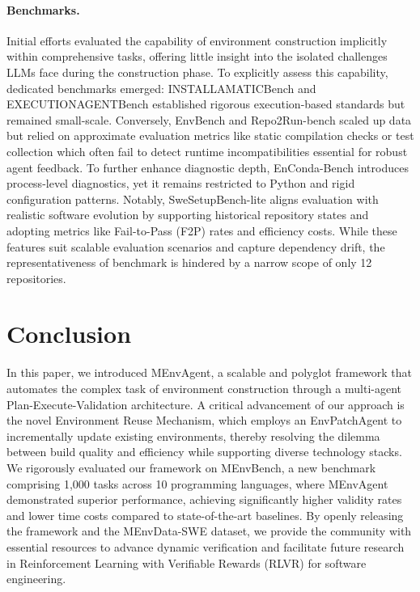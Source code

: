 \documentclass{article}
\theoremstyle{plain}
\theoremstyle{definition}
\theoremstyle{remark}
\begin{document}
\paragraph{Benchmarks.}
Initial efforts evaluated the capability of environment construction implicitly within comprehensive tasks\cite{bogin_super_2024,siegel_core-bench_2024,tang_ml-bench_2024}, offering little insight into the isolated challenges LLMs face during the construction phase.
To explicitly assess this capability, dedicated benchmarks emerged: INSTALLAMATICBench\cite{milliken_beyond_2025} and EXECUTIONAGENTBench\cite{bouzenia_you_2025} established rigorous execution-based standards but remained small-scale. 
Conversely, EnvBench\cite{eliseeva_envbench_2025} and Repo2Run-bench\cite{hu_repo2run_2025} scaled up data but relied on approximate evaluation metrics like static compilation checks or test collection which often fail to detect runtime incompatibilities essential for robust agent feedback.
To further enhance diagnostic depth, EnConda-Bench\cite{kuang_process-level_2025} introduces process-level diagnostics, yet it remains restricted to Python and rigid configuration patterns. 
Notably, SweSetupBench-lite\cite{guo_swe-factory_2025} aligns evaluation with realistic software evolution by supporting historical repository states and adopting metrics like Fail-to-Pass (F2P) rates and efficiency costs. While these features suit scalable evaluation scenarios and capture dependency drift, the representativeness of benchmark is hindered by a narrow scope of only 12 repositories.
\section{Conclusion}

In this paper, we introduced MEnvAgent, a scalable and polyglot framework that automates the complex task of environment construction through a multi-agent Plan-Execute-Validation architecture. A critical advancement of our approach is the novel Environment Reuse Mechanism, which employs an EnvPatchAgent to incrementally update existing environments, thereby resolving the dilemma between build quality and efficiency while supporting diverse technology stacks. We rigorously evaluated our framework on MEnvBench, a new benchmark comprising 1,000 tasks across 10 programming languages, where MEnvAgent demonstrated superior performance, achieving significantly higher validity rates and lower time costs compared to state-of-the-art baselines. By openly releasing the framework and the MEnvData-SWE dataset, we provide the community with essential resources to advance dynamic verification and facilitate future research in Reinforcement Learning with Verifiable Rewards (RLVR) for software engineering.
\end{document}
